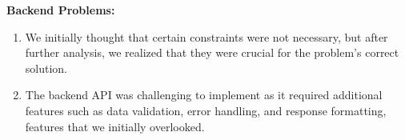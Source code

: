 \documentclass[a4paper, 11pt]{article}
\begin{document}
\textbf{Backend Problems:}

\begin{enumerate}
	\item We initially thought that certain constraints were not necessary, but after further analysis, we realized that they were crucial for the problem's correct solution.
	\item The backend API was challenging to implement as it required additional features such as data validation, error handling, and response formatting, features that we initially overlooked.
\end{enumerate}
\end{document}
